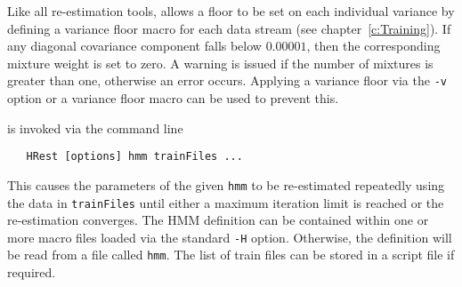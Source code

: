 Like all re-estimation tools,  allows a floor to  be set on
each individual variance by defining a variance floor macro for each
data stream (see chapter~\ref{c:Training}).  If any diagonal covariance
component falls below $0.00001$, then the corresponding mixture weight is
set to zero.  A warning is issued if the number of mixtures is greater
than one, otherwise an error occurs.  Applying a variance floor via the
{\tt -v} option or a variance floor macro can be used to prevent this.


 is invoked via the command line
\begin{verbatim}
   HRest [options] hmm trainFiles ...
\end{verbatim}
This causes the parameters of the given {\tt hmm} to be
re-estimated repeatedly using the data in {\tt trainFiles} 
until either a maximum iteration limit is reached
or the re-estimation converges. 
The HMM definition can be contained within one or more macro
files loaded via the standard \texttt{-H} option.  Otherwise, the 
definition will be read from a file called \texttt{hmm}.
The list of train files
can be stored in a script file if required.

